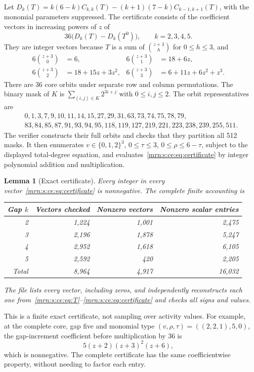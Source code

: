 \documentclass[11pt,a4paper]{article}
\newtheorem{lemma}[theorem]{Lemma}
\theoremstyle{remark}\newtheorem{remark}[theorem]{Remark}
\begin{document}
Let $D_k(T)=k(6-k)C_{k,k}(T)-(k+1)(7-k)C_{k-1,k+1}(T)$, with the monomial parameters suppressed. The certificate consists of the coefficient vectors in increasing powers of $z$ of
\begin{equation}\label{mrn:s:ce:eq:certificate}
 36\bigl(D_k(T)-D_k(T^0)\bigr),\qquad k=2,3,4,5.
\end{equation}
They are integer vectors because $T$ is a sum of $\binom{z+3}{h}$ for $0\le h\le3$, and
\begin{align*}
 6\binom{z+3}{0}&=6,&6\binom{z+3}{1}&=18+6z,\\
 6\binom{z+3}{2}&=18+15z+3z^2,&
 6\binom{z+3}{3}&=6+11z+6z^2+z^3.
\end{align*}
There are 36 core orbits under separate row and column permutations. The binary mask of $K$ is $\sum_{(i,j)\in K}2^{3i+j}$ with $0\le i,j\le2$. The orbit representatives are
\begin{align*}
 &0,1,3,7,9,10,11,14,15,27,29,31,63,73,74,75,78,79,\\
 &83,84,85,87,91,93,94,95,118,119,127,219,221,223,238,239,255,511.
\end{align*}
The verifier constructs their full orbits and checks that they partition all 512 masks. It then enumerates $v\in\{0,1,2\}^3$, $0\le\tau\le3$, $0\le\rho\le6-\tau$, subject to the displayed total-degree equation, and evaluates~\eqref{mrn:s:ce:eq:certificate} by integer polynomial addition and multiplication.

\begin{lemma}[Exact certificate]\label{mrn:s:ce:lem:cert}
Every integer in every vector~\eqref{mrn:s:ce:eq:certificate} is nonnegative. The complete finite accounting is
\begin{center}
\begin{tabular}{rrrr}\toprule
Gap $k$&Vectors checked&Nonzero vectors&Nonzero scalar entries\\\midrule
2&1,224&1,001&2,475\\
3&2,196&1,878&5,247\\
4&2,952&1,618&6,105\\
5&2,592&420&2,205\\\midrule
Total&8,964&4,917&16,032\\\bottomrule
\end{tabular}
\end{center}
The file  lists every vector, including zeros, and  independently reconstructs each one from~\eqref{mrn:s:ce:eq:T}--\eqref{mrn:s:ce:eq:certificate} and checks all signs and values.
\end{lemma}
This is a finite exact certificate, not sampling over activity values. For example, at the complete core, gap five and monomial type $(v,\rho,\tau)=((2,2,1),5,0)$, the gap-increment coefficient before multiplication by 36 is
\[
 5(z+2)(z+3)^2(z+6),
\]
which is nonnegative. The complete certificate has the same coefficientwise property, without needing to factor each entry.
\end{document}

